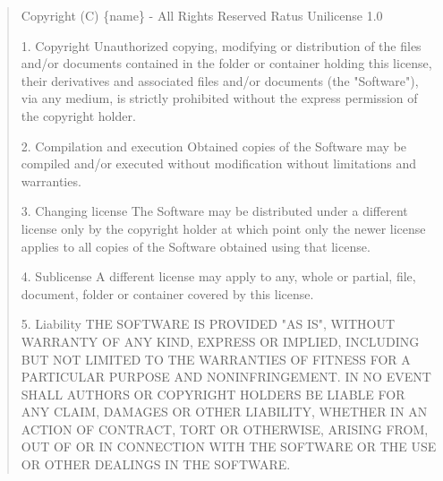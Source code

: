 \documentclass[a4paper,11pt]{article}
\begin{document}
  \begin{quote}
    Copyright (C) \{name\} - All Rights Reserved\newline
    Ratus Unilicense 1.0

    1. Copyright\newline
    Unauthorized copying, modifying or distribution of the files and/or
    documents contained in the folder or container holding this license,
    their derivatives and associated files and/or documents (the "Software"),
    via any medium, is strictly prohibited without the express permission of
    the copyright holder.

    2. Compilation and execution\newline
    Obtained copies of the Software may be compiled and/or executed without
    modification without limitations and warranties.

    3. Changing license\newline
    The Software may be distributed under a different license only by the
    copyright holder at which point only the newer license applies to all
    copies of the Software obtained using that license.

    4. Sublicense\newline
    A different license may apply to any, whole or partial, file, document,
    folder or container covered by this license.

    5. Liability\newline
    THE SOFTWARE IS PROVIDED "AS IS", WITHOUT WARRANTY OF ANY KIND, EXPRESS OR
    IMPLIED, INCLUDING BUT NOT LIMITED TO THE WARRANTIES OF FITNESS FOR A
    PARTICULAR PURPOSE AND NONINFRINGEMENT. IN NO EVENT SHALL AUTHORS OR
    COPYRIGHT HOLDERS BE LIABLE FOR ANY CLAIM, DAMAGES OR OTHER LIABILITY,
    WHETHER IN AN ACTION OF CONTRACT, TORT OR OTHERWISE, ARISING FROM, OUT OF
    OR IN CONNECTION WITH THE SOFTWARE OR THE USE OR OTHER DEALINGS IN THE
    SOFTWARE.

  \end{quote}


\end{document}
